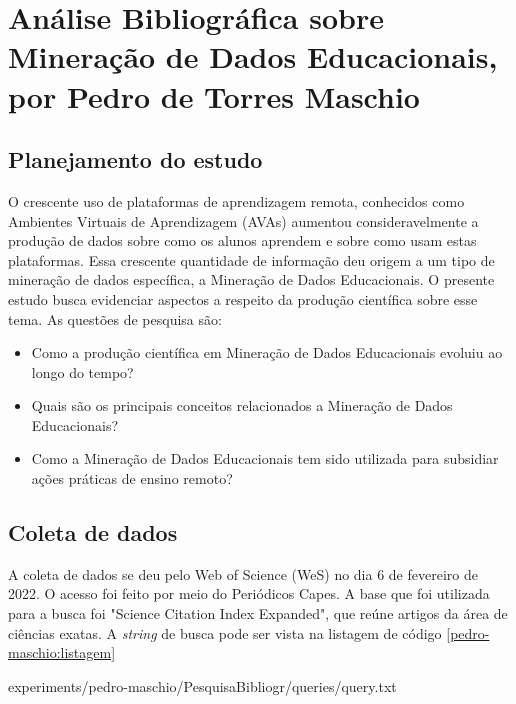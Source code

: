 \chapter{Análise Bibliográfica sobre Mineração de Dados Educacionais, por Pedro de Torres Maschio\label{chap:bibliometria:pedro-maschio}}


\section{Planejamento do estudo}

O crescente uso de plataformas de aprendizagem remota, conhecidos como Ambientes Virtuais de Aprendizagem (AVAs) aumentou consideravelmente a produção de dados sobre como os alunos aprendem e sobre como usam estas plataformas. Essa crescente quantidade de informação deu origem a um tipo de mineração de dados específica, a Mineração de Dados Educacionais. O presente estudo busca evidenciar aspectos a respeito da produção científica sobre esse tema. As questões de pesquisa são:

\begin{itemize}
    \item Como a produção científica em Mineração de Dados Educacionais evoluiu ao longo do tempo?
    \item Quais são os principais conceitos relacionados a Mineração de Dados Educacionais?
    \item Como a Mineração de Dados Educacionais tem sido utilizada para subsidiar ações práticas de ensino remoto?
\end{itemize}

\section{Coleta de dados}

A coleta de dados se deu pelo Web of Science (WeS) no dia 6 de fevereiro de 2022. O acesso foi feito por meio do Periódicos Capes. A base que foi utilizada para a busca foi "Science Citation Index Expanded", que reúne artigos da área de ciências exatas. A \textit{string} de busca pode ser vista na listagem de código \ref{pedro-maschio:listagem}


{experiments/pedro-maschio/PesquisaBibliogr/queries/query.txt}



